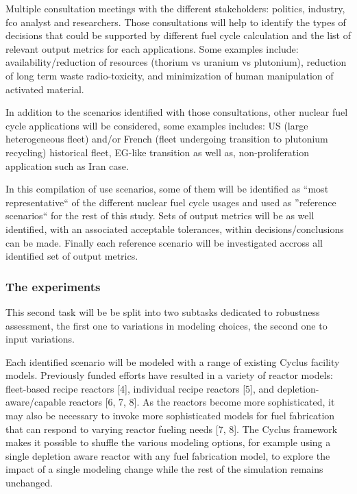 Multiple consultation meetings with the different stakeholders: politics,
industry, fco analyst and researchers. Those consultations will help to identify
the types of decisions that could be supported by different fuel cycle
calculation and the list of relevant output metrics for each applications. 
Some examples include: availability/reduction of resources (thorium vs uranium
vs plutonium), reduction of long term waste radio-toxicity, and minimization of
human manipulation of activated material.

In addition to the scenarios identified with those consultations, other nuclear
fuel cycle applications will be considered, some examples includes: US (large
heterogeneous fleet) and/or French (fleet undergoing transition to plutonium
recycling) historical fleet, EG-like transition as well as, non-proliferation
application such as Iran case.

In this compilation of use scenarios, some of them will be identified as ``most
representative`` of the different nuclear fuel cycle usages and used as
''reference scenarios`` for the rest of this study. Sets of output metrics
will be as well identified, with an associated acceptable tolerances, within
decisions/conclusions can be made. Finally each reference scenario will be
investigated accross all identified set of output metrics.


\subsubsection{The experiments}

This second task will be be split into two subtasks dedicated to robustness
assessment, the first one to variations in modeling choices, the second one to
input variations.  

Each identified scenario will be modeled with a range of existing Cyclus
facility models.  Previously funded efforts have resulted in a variety of
reactor models: fleet-based recipe reactors [4], individual recipe reactors [5],
and depletion-aware/capable reactors [6, 7, 8].  As the reactors become more
sophisticated, it may also be necessary to invoke more sophisticated models for
fuel fabrication that can respond to varying reactor fueling needs [7, 8]. The
Cyclus framework makes it possible to shuffle the various modeling options, for
example using a single depletion aware reactor with any fuel fabrication model,
to explore the impact of a single modeling change while the rest of the
simulation remains unchanged.  

